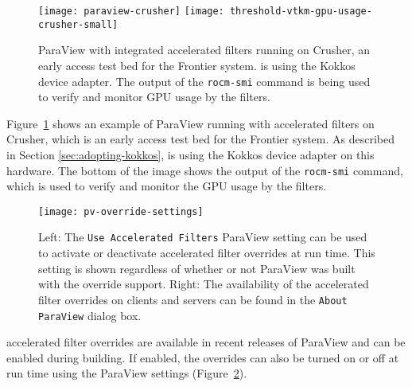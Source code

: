 \begin{figure}[t]
  \texttt{[image: paraview-crusher]}
  \texttt{[image: threshold-vtkm-gpu-usage-crusher-small]}
  \caption{
    ParaView with integrated \vtkm accelerated filters running on Crusher, an early access test bed for the Frontier system.
    \vtkm is using the Kokkos device adapter.
    The output of the \texttt{rocm-smi} command is being used to verify and monitor GPU usage by the filters.
  }
  \label{fig:paraview-crusher}
\end{figure}

Figure~\ref{fig:paraview-crusher} shows an example of ParaView running with \vtkm accelerated filters on Crusher, which is an early access test bed for the Frontier system.
As described in Section \ref{sec:adopting-kokkos}, \vtkm is using the Kokkos device adapter on this hardware.
The bottom of the image shows the output of the \texttt{rocm-smi} command, which is used to verify and monitor the GPU usage by the filters.

\begin{figure}[htb]
  \texttt{[image: pv-override-settings]}
  \caption{
    Left: The \texttt{Use Accelerated Filters} ParaView setting can be used to activate or deactivate accelerated filter overrides at run time.
    This setting is shown regardless of whether or not ParaView was built with the override support.
    Right: The availability of the accelerated filter overrides on clients and servers can be found in the \texttt{About ParaView} dialog box.
  }
  \label{fig:paraview_settings}
\end{figure}

\vtkm accelerated filter overrides are available in recent releases of ParaView and can be enabled during building.
If enabled, the overrides can also be turned on or off at run time using the ParaView settings (Figure~\ref{fig:paraview_settings}).

